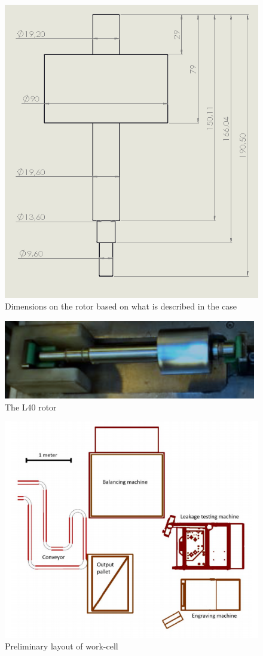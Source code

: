 \begin{figure}[H]
    \centering
    \includegraphics[width=.70\textwidth]{InitialProblemstatement/Case/rotordims.PNG}
    \caption{Dimensions on the rotor based on what is described in the case\cite{Case}}
    \label{fig:rotor_dims}
\end{figure}

\begin{figure}[H]
    \centering
    \includegraphics[width=.48\textwidth]{InitialProblemstatement/Case/rotorlille.PNG}
    \caption{The L40 rotor}
    \label{fig:rotor}
\end{figure}

\begin{figure}[H]
    \centering
   \includegraphics[width=\textwidth]{TechnicalAnlysis/layout.PNG}
    \caption{Preliminary layout of work-cell\cite{Case}}
    \label{fig:Layoutworkcell} 
\end{figure}